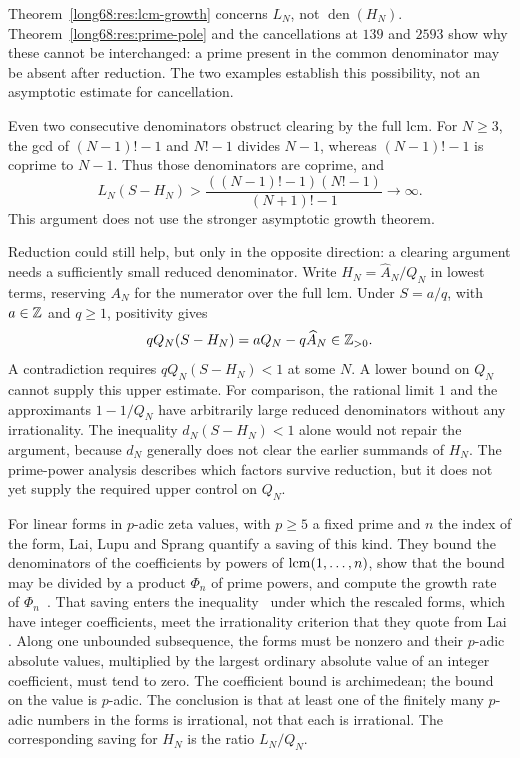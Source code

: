 \documentclass[11pt]{article}
\newcommand{\Ser}{S}
\newcommand{\Lc}{L}
\newcommand{\den}{\operatorname{den}}
\begin{document}
Theorem~\ref{long68:res:lcm-growth} concerns $\Lc_N$, not $\den(H_N)$.
Theorem~\ref{long68:res:prime-pole} and the cancellations at $139$ and $2593$
show why these cannot be interchanged: a prime present in the common
denominator may be absent after reduction. The two examples establish this
possibility, not an asymptotic estimate for cancellation.

Even two consecutive denominators obstruct clearing by the full lcm. For
$N\ge3$, the gcd of $(N-1)!-1$ and $N!-1$ divides $N-1$, whereas
$(N-1)!-1$ is coprime to $N-1$. Thus those denominators are coprime, and
\[
\Lc_N(\Ser-H_N)>
\frac{((N-1)!-1)(N!-1)}{(N+1)!-1}\longrightarrow\infty.
\]
This argument does not use the stronger asymptotic growth theorem.

Reduction could still help, but only in the opposite direction: a
clearing argument needs a sufficiently small reduced denominator.
Write $H_N=\widehat A_N/Q_N$ in lowest terms, reserving $A_N$ for the
numerator over the full lcm. Under $\Ser=a/q$, with $a\in\mathbb{Z}$ and
$q\ge1$, positivity gives
\[
 qQ_N(\Ser-H_N)=aQ_N-q\widehat A_N\in\Z_{>0}.
\]
A contradiction requires $qQ_N(\Ser-H_N)<1$ at some $N$. A lower
bound on $Q_N$ cannot supply this upper estimate. For comparison, the
rational limit $1$ and the approximants
$1-1/Q_N$ have arbitrarily large reduced denominators without any
irrationality.  The inequality $d_N(\Ser-H_N)<1$ alone would not repair the
argument, because $d_N$ generally does not clear the earlier summands of
$H_N$.  The prime-power analysis describes which factors survive reduction,
but it does not yet supply the required upper control on $Q_N$.

For linear forms in $p$-adic zeta values, with $p\ge5$ a fixed prime and $n$
the index of the form, Lai, Lupu and Sprang quantify a saving of this kind.
They bound the denominators of the coefficients by powers of
$\operatorname{lcm}(1,\ldots,n)$, show that the bound may be divided by a product $\Phi_n$
of prime powers, and compute the growth rate of
$\Phi_n$~\cite[Lemmas~5.3--5.7 and~7.3]{lai-lupu-sprang}.  That saving enters
the inequality~\cite[(8.1)]{lai-lupu-sprang} under which the rescaled forms,
which have integer coefficients, meet the irrationality criterion
\cite[Lemma~2.1, p.~3]{lai-lupu-sprang} that they quote from Lai
\cite[Lemma~2.1, p.~4]{lai-2adic}. Along one unbounded subsequence, the forms
must be nonzero and their $p$-adic absolute values, multiplied by the
largest ordinary absolute value of an integer coefficient, must tend to
zero. The coefficient bound is archimedean; the bound on the value is
$p$-adic. The conclusion is that at least one of the finitely many
$p$-adic numbers in the forms is irrational, not that each is irrational.
The corresponding saving for $H_N$ is the ratio $\Lc_N/Q_N$.
\end{document}
